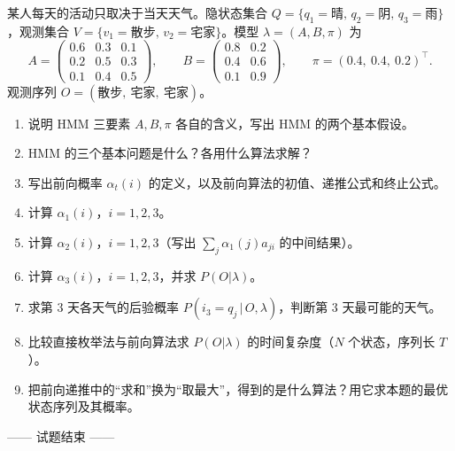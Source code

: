 某人每天的活动只取决于当天天气。隐状态集合 $Q=\{q_1{=}\text{晴},\,q_2{=}\text{阴},\,q_3{=}\text{雨}\}$，观测集合 $V=\{v_1{=}\text{散步},\,v_2{=}\text{宅家}\}$。模型 $\lambda=(A,B,\pi)$ 为
\[
A=\begin{pmatrix}0.6&0.3&0.1\\0.2&0.5&0.3\\0.1&0.4&0.5\end{pmatrix},\qquad
B=\begin{pmatrix}0.8&0.2\\0.4&0.6\\0.1&0.9\end{pmatrix},\qquad
\pi=(0.4,\ 0.4,\ 0.2)^\top .
\]
观测序列 $O=(\text{散步},\ \text{宅家},\ \text{宅家})$。
\begin{enumerate}[label=(\arabic*)]
\item 说明 HMM 三要素 $A,B,\pi$ 各自的含义，写出 HMM 的两个基本假设。
\item HMM 的三个基本问题是什么？各用什么算法求解？
\item 写出前向概率 $\alpha_t(i)$ 的定义，以及前向算法的初值、递推公式和终止公式。
\item 计算 $\alpha_1(i)$，$i=1,2,3$。
\item 计算 $\alpha_2(i)$，$i=1,2,3$（写出 $\sum_j\alpha_1(j)a_{ji}$ 的中间结果）。
\item 计算 $\alpha_3(i)$，$i=1,2,3$，并求 $P(O|\lambda)$。
\item 求第 3 天各天气的后验概率 $P(i_3=q_j\,|\,O,\lambda)$，判断第 3 天最可能的天气。
\item 比较直接枚举法与前向算法求 $P(O|\lambda)$ 的时间复杂度（$N$ 个状态，序列长 $T$）。
\item 把前向递推中的“求和”换为“取最大”，得到的是什么算法？用它求本题的最优状态序列及其概率。
\end{enumerate}

\vfill
\begin{center} —— 试题结束 ——\end{center}

